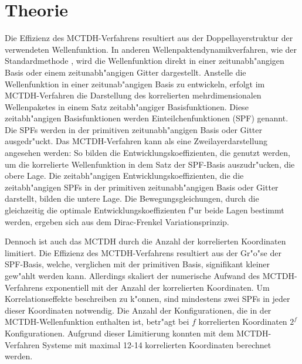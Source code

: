 \chapter{Theorie}


 Die Effizienz des MCTDH-Verfahrens resultiert aus der Doppellayerstruktur der verwendeten Wellenfunktion. In anderen Wellenpaktendynamikverfahren, 
wie der Standardmethode \cite{MCTDHreview3}, wird die Wellenfunktion direkt in einer zeitunabh"angigen Basis oder einem zeitunabh"angigen Gitter dargestellt. 
Anstelle die Wellenfunktion in einer zeitunab"angigen Basis zu entwickeln,
erfolgt im MCTDH-Verfahren die Darstellung des korrelierten mehrdimensionalen Wellenpaketes in einem Satz zeitabh"angiger Basisfunktionen.
Diese zeitabh"angigen Basisfunktionen werden Einteilchenfunktionen (SPF) genannt. Die SPFs werden in der primitiven zeitunabh"angigen Basis oder Gitter ausgedr"uckt.
Das MCTDH-Verfahren kann als eine Zweilayerdarstellung angesehen werden:
So bilden die Entwicklungskoeffizienten, die genutzt werden, um die korrelierte Wellenfunktion in dem Satz der SPF-Basis auszudr"ucken, die obere Lage.
Die zeitabh"angigen Entwicklungskoeffizienten, die die zeitabh"angigen SPFs in der primitiven zeitunabh"angigen Basis oder Gitter darstellt, bilden die untere Lage.
Die Bewegungsgleichungen, durch die gleichzeitig die optimale Entwicklungskoeffizienten f"ur beide Lagen bestimmt werden, ergeben sich aus dem Dirac-Frenkel Variationsprinzip.
   
Dennoch ist auch das MCTDH durch die Anzahl der korrelierten Koordinaten limitiert. 
Die Effizienz des MCTDH-Verfahrens resultiert aus der Gr"o"se der SPF-Basis, welche, verglichen mit der primitiven Basis, signifikant kleiner gew"ahlt werden kann.
Aller\-dings skaliert der numerische Aufwand des MCTDH-Verfahrens exponentiell mit der Anzahl der kor\-relierten Koordinaten.
Um Korrelationseffekte beschreiben zu k"onnen, sind mindestens zwei SPFs in jeder dieser Koordinaten notwendig.
Die Anzahl der Konfigurationen, die in der MCTDH-Wellenfunktion enthalten ist, betr"agt bei $ f $ korrelierten Koordinaten $ 2^f $ Konfigurationen.
Aufgrund dieser Limitierung konnten mit dem MCTDH-Verfahren Systeme mit maximal 12-14 korrelierten Koordinaten  berechnet werden.\cite{HM1, HM2, HM4, WWM, WWM2, HM5,
 WMC, BWHHM}
 
